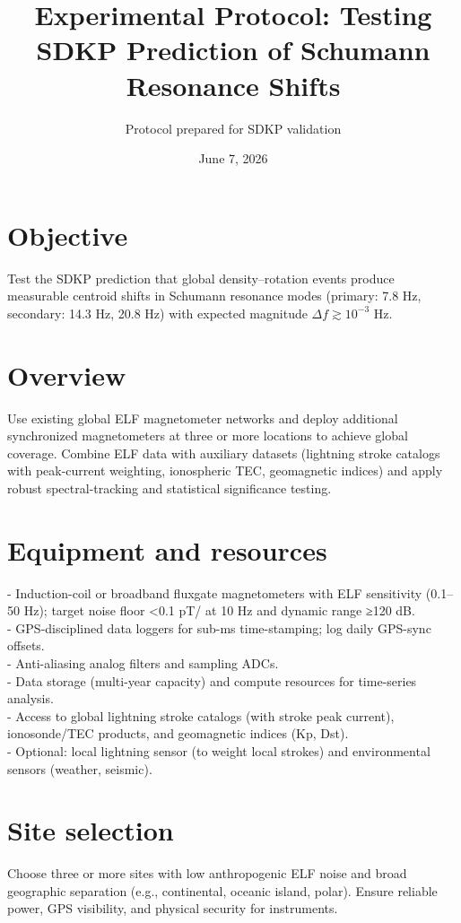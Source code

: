 \documentclass[11pt]{article}
\title{Experimental Protocol: Testing SDKP Prediction of Schumann Resonance Shifts}
\author{Protocol prepared for SDKP validation}
\date{June 7, 2026}
\begin{document}
\maketitle

\section*{Objective}
Test the SDKP prediction that global density--rotation events produce measurable centroid shifts in Schumann resonance modes (primary: 7.8 Hz, secondary: 14.3 Hz, 20.8 Hz) with expected magnitude $\Delta f\gtrsim10^{-3}$ Hz.

\section*{Overview}
Use existing global ELF magnetometer networks and deploy additional synchronized magnetometers at three or more locations to achieve global coverage. Combine ELF data with auxiliary datasets (lightning stroke catalogs with peak-current weighting, ionospheric TEC, geomagnetic indices) and apply robust spectral-tracking and statistical significance testing.

\section*{Equipment and resources}
- Induction-coil or broadband fluxgate magnetometers with ELF sensitivity (0.1--50 Hz); target noise floor <0.1 pT/ at 10 Hz and dynamic range ≥120 dB.\\
- GPS-disciplined data loggers for sub-ms time-stamping; log daily GPS-sync offsets.\\
- Anti-aliasing analog filters and sampling ADCs.\\
- Data storage (multi-year capacity) and compute resources for time-series analysis.\\
- Access to global lightning stroke catalogs (with stroke peak current), ionosonde/TEC products, and geomagnetic indices (Kp, Dst).\\
- Optional: local lightning sensor (to weight local strokes) and environmental sensors (weather, seismic).

\section*{Site selection}
Choose three or more sites with low anthropogenic ELF noise and broad geographic separation (e.g., continental, oceanic island, polar). Ensure reliable power, GPS visibility, and physical security for instruments.
\end{document}
